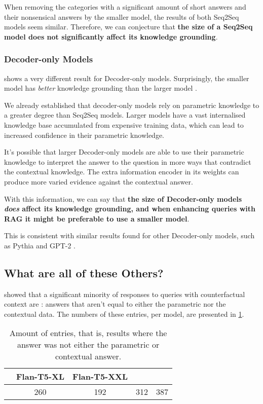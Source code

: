 When removing the categories with a significant amount of short answers and their nonsensical answers by the smaller model, the results of both Seq2Seq models seem similar.
Therefore, we can conjecture that \textbf{the size of a Seq2Seq model does not significantly affect its knowledge grounding}.

\subsubsection{Decoder-only Models}

 shows a very different result for Decoder-only models.
Surprisingly, the smaller model \smallllama{} has \textit{better} knowledge grounding than the larger model \bigllama{}.

We already established that decoder-only models rely on parametric knowledge to a greater degree than Seq2Seq models.
Larger models have a vast internalised knowledge base accumulated from expensive training data, which can lead to increased confidence in their parametric knowledge.

It's possible that larger Decoder-only models are able to use their parametric knowledge to interpret the answer to the question in more ways that contradict the contextual knowledge.
The extra information encoder in its weights can produce more varied evidence against the contextual answer.

With this information, we can say that \textbf{the size of Decoder-only models \textit{does} affect its knowledge grounding, and when enhancing queries with RAG it might be preferable to use a smaller model}.

This is consistent with similar results found for other Decoder-only models, such as Pythia and GPT-2 \citep{factual_recall}.

\subsection{What are all of these Others?}

 showed that a significant minority of responses to queries with counterfactual context are \Other{}: answers that aren't equal to either the parametric nor the contextual data.
The numbers of these entries, per model, are presented in \cref{others_list}.

\begin{table}[h]
	\centering
	\footnotesize
	\begin{tabular}{>{\bfseries}l | c c c c}
		\toprule
			& \ttfamily\scriptsize Flan-T5-XL & \ttfamily\scriptsize Flan-T5-XXL & \ttfamily\scriptsize \llamaparbox{} & \ttfamily\scriptsize \bigllamaparbox{} \\
		\midrule
			\Other{} & 260 & 192 & 312 & 387 \\
		\bottomrule
	\end{tabular}
	\caption{Amount of \Other{} entries, that is, results where the answer was not either the parametric or contextual answer.}
	\label{others_list}
\end{table}

